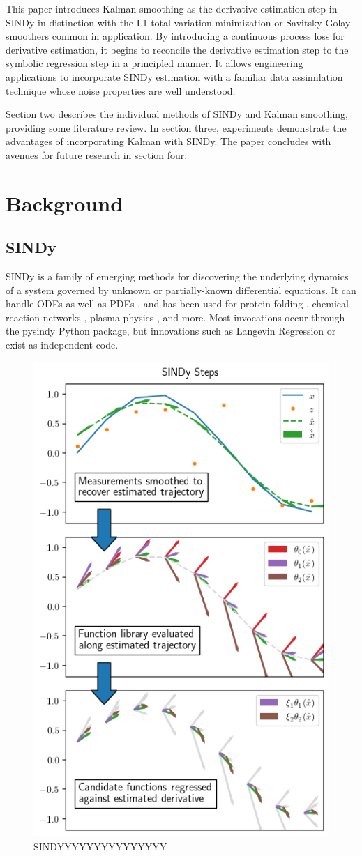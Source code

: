 \documentclass{article}
\begin{document}
This paper introduces Kalman smoothing as the derivative estimation step in SINDy in distinction with the L1 total variation minimization or Savitsky-Golay smoothers common in application.
By introducing a continuous process loss for derivative estimation, it begins to reconcile the derivative estimation step to the symbolic regression step in a principled manner.
It allows engineering applications to incorporate SINDy estimation with a familiar data assimilation technique whose noise properties are well understood.

Section two describes the individual methods of SINDy and Kalman smoothing, providing some literature review.  In section three, experiments demonstrate the advantages of incorporating Kalman with SINDy.  The paper concludes with avenues for future research in section four.

\section{Background}

\subsection{SINDy}
SINDy \cite{Brunton2016} is a family of emerging methods for discovering the underlying dynamics of a system governed by unknown or partially-known \cite{Champion2020} differential equations.  It can handle ODEs as well as PDEs \cite{Rudy2017}, and has been used for protein folding \cite{Boninsegna2018}, chemical reaction networks \cite{Hoffmann2019}, plasma physics \cite{Guan2021}, and more.  Most invocations occur through the pysindy Python package, but innovations such as Langevin Regression \cite{Callaham2021} or \cite{Rudy2019} exist as independent code.

\begin{figure}[h]
    \label{fig:sindy}
    \centering
    \includegraphics[width=.5\textwidth]{images/explain_sindy}
    \caption{SINDYYYYYYYYYYYYYYY}
\end{figure}
\end{document}
